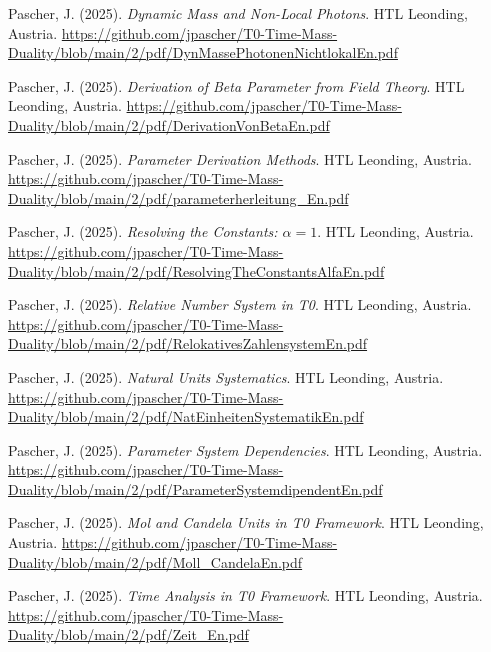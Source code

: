\documentclass{article}
\begin{document}
\begin{thebibliography}{99}
		Pascher, J. (2025).
		\textit{Dynamic Mass and Non-Local Photons}.
		HTL Leonding, Austria.
		\url{https://github.com/jpascher/T0-Time-Mass-Duality/blob/main/2/pdf/DynMassePhotonenNichtlokalEn.pdf}
		
		
		Pascher, J. (2025).
		\textit{Derivation of Beta Parameter from Field Theory}.
		HTL Leonding, Austria.
		\url{https://github.com/jpascher/T0-Time-Mass-Duality/blob/main/2/pdf/DerivationVonBetaEn.pdf}
		
		Pascher, J. (2025).
		\textit{Parameter Derivation Methods}.
		HTL Leonding, Austria.
		\url{https://github.com/jpascher/T0-Time-Mass-Duality/blob/main/2/pdf/parameterherleitung_En.pdf}
		
		Pascher, J. (2025).
		\textit{Resolving the Constants: $\alpha = 1$}.
		HTL Leonding, Austria.
		\url{https://github.com/jpascher/T0-Time-Mass-Duality/blob/main/2/pdf/ResolvingTheConstantsAlfaEn.pdf}
		
		Pascher, J. (2025).
		\textit{Relative Number System in T0}.
		HTL Leonding, Austria.
		\url{https://github.com/jpascher/T0-Time-Mass-Duality/blob/main/2/pdf/RelokativesZahlensystemEn.pdf}
		
		Pascher, J. (2025).
		\textit{Natural Units Systematics}.
		HTL Leonding, Austria.
		\url{https://github.com/jpascher/T0-Time-Mass-Duality/blob/main/2/pdf/NatEinheitenSystematikEn.pdf}
		
		Pascher, J. (2025).
		\textit{Parameter System Dependencies}.
		HTL Leonding, Austria.
		\url{https://github.com/jpascher/T0-Time-Mass-Duality/blob/main/2/pdf/ParameterSystemdipendentEn.pdf}
		
		Pascher, J. (2025).
		\textit{Mol and Candela Units in T0 Framework}.
		HTL Leonding, Austria.
		\url{https://github.com/jpascher/T0-Time-Mass-Duality/blob/main/2/pdf/Moll_CandelaEn.pdf}
		
		
		Pascher, J. (2025).
		\textit{Time Analysis in T0 Framework}.
		HTL Leonding, Austria.
		\url{https://github.com/jpascher/T0-Time-Mass-Duality/blob/main/2/pdf/Zeit_En.pdf}
		

\end{thebibliography}
\end{document}
